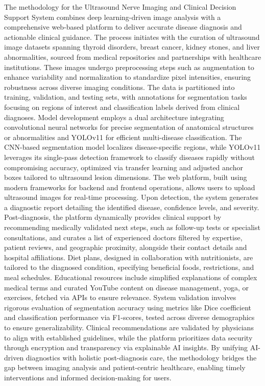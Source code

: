 \documentclass[12pt]{article}
\begin{document}
\noindent The methodology for the Ultrasound Nerve Imaging and Clinical Decision Support System combines deep learning-driven image analysis with a comprehensive web-based platform to deliver accurate disease diagnosis and actionable clinical guidance. The process initiates with the curation of ultrasound image datasets spanning thyroid disorders, breast cancer, kidney stones, and liver abnormalities, sourced from medical repositories and partnerships with healthcare institutions. These images undergo preprocessing steps such as augmentation to enhance variability and normalization to standardize pixel intensities, ensuring robustness across diverse imaging conditions. The data is partitioned into training, validation, and testing sets, with annotations for segmentation tasks focusing on regions of interest and classification labels derived from clinical diagnoses. Model development employs a dual architecture integrating convolutional neural networks for precise segmentation of anatomical structures or abnormalities and YOLOv11 for efficient multi-disease classification. The CNN-based segmentation model localizes disease-specific regions, while YOLOv11 leverages its single-pass detection framework to classify diseases rapidly without compromising accuracy, optimized via transfer learning and adjusted anchor boxes tailored to ultrasound lesion dimensions. The web platform, built using modern frameworks for backend and frontend operations, allows users to upload ultrasound images for real-time processing. Upon detection, the system generates a diagnostic report detailing the identified disease, confidence levels, and severity. Post-diagnosis, the platform dynamically provides clinical support by recommending medically validated next steps, such as follow-up tests or specialist consultations, and curates a list of experienced doctors filtered by expertise, patient reviews, and geographic proximity, alongside their contact details and hospital affiliations. Diet plans, designed in collaboration with nutritionists, are tailored to the diagnosed condition, specifying beneficial foods, restrictions, and meal schedules. Educational resources include simplified explanations of complex medical terms and curated YouTube content on disease management, yoga, or exercises, fetched via APIs to ensure relevance. System validation involves rigorous evaluation of segmentation accuracy using metrics like Dice coefficient and classification performance via F1-scores, tested across diverse demographics to ensure generalizability. Clinical recommendations are validated by physicians to align with established guidelines, while the platform prioritizes data security through encryption and transparency via explainable AI insights. By unifying AI-driven diagnostics with holistic post-diagnosis care, the methodology bridges the gap between imaging analysis and patient-centric healthcare, enabling timely interventions and informed decision-making for users.
\vspace{5pt}
\end{document}

